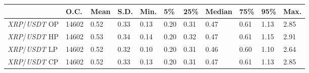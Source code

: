 \begin{tabular}{lllllllllll}
\toprule
 & \textbf{O.C.} & \textbf{Mean} & \textbf{S.D.} & \textbf{Min.} & \textbf{5\%} & \textbf{25\%} & \textbf{Median} & \textbf{75\%} & \textbf{95\%} & \textbf{Max.} \\
\midrule
\emph{XRP}/\emph{USDT} OP & 14602 & 0.52 & 0.33 & 0.13 & 0.20 & 0.31 & 0.47 & 0.61 & 1.13 & 2.85 \\
\emph{XRP}/\emph{USDT} HP & 14602 & 0.53 & 0.34 & 0.14 & 0.20 & 0.32 & 0.47 & 0.61 & 1.15 & 2.91 \\
\emph{XRP}/\emph{USDT} LP & 14602 & 0.52 & 0.32 & 0.10 & 0.20 & 0.31 & 0.46 & 0.60 & 1.10 & 2.64 \\
\emph{XRP}/\emph{USDT} CP & 14602 & 0.52 & 0.33 & 0.13 & 0.20 & 0.31 & 0.47 & 0.61 & 1.13 & 2.85 \\
\bottomrule
\end{tabular}
